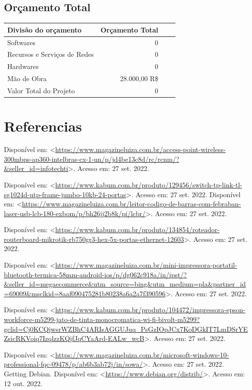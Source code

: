 \documentclass[12pt]{article}
\begin{document}
\subsection{Orçamento Total}
\begin{center}
\begin{tabular}{| l | r | r | r |}
\hline 
Divisão do orçamento & Orçamento Total\\
\hline
Softwares & 0\\
Recursos e Serviços de Redes & 0\\
Hardwares & 0\\
Mão de Obra & 28.000,00 R\$\\
Valor Total do Projeto & 0\\
\hline
\end{tabular}
\end{center}

\section{Referencias}



Disponível em: <\url{https://www.magazineluiza.com.br/access-point-wireless-300mbps-ap360-intelbras-cx-1-un/p/jd4be13c8d/rc/rcnm/?&seller_id=infotechti}>. Acesso em: 27 set. 2022.

Disponível em: <\url{https://www.kabum.com.br/produto/129456/switch-tp-link-tl-sg1024d-utp-frame-jumbo-10kb-24-portas}>. Acesso em: 27 set. 2022.
Disponível em: <\url{https://www.magazineluiza.com.br/leitor-codigo-de-barras-com-febraban-laser-usb-lcb-180-exbom/p/bh26jj2b8k/pi/lcbr/}>. Acesso em: 27 set. 2022.

Disponível em: <\url{https://www.kabum.com.br/produto/134854/roteador-routerboard-mikrotik-rb750gr3-hex-5x-portas-ethernet-12603}>. Acesso em: 27 set. 2022.

Disponível em: <\url{https://www.magazineluiza.com.br/mini-impressora-portatil-bluetooth-termica-58mm-android-ios/p/dg062c918a/in/ipst/?&seller_id=megaecommerce&utm_source=bing&utm_medium=pla&partner_id=69009&msclkid=8aaf090475281b80238a6a2a7f390596}>. Acesso em: 27 set. 2022.

Disponível em: <\url{https://www.kabum.com.br/produto/104472/impressora-epson-workforce-m5299-jato-de-tinta-monocromatica-wi-fi-bivolt-m5299?gclid=Cj0KCQjwsrWZBhC4ARIsAGGUJuq_PsGzIOpJCx7KoDGkIT7LmDSrYEZsicRKVoiq7IzqlzzKQjfJqCYaArd-EALw_wcB}>. Acesso em: 27 set. 2022.

Disponível em: <\url{https://www.magazineluiza.com.br/microsoft-windows-10-professional-fqc-09478/p/ab6b3ab72j/in/sowa/}>. Acesso em: 27 set. 2022.
Getting Debian. Disponível em: <\url{https://www.debian.org/distrib/}>. Acesso em: 12 out. 2022.
\end{document}
